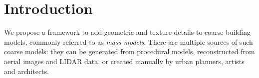 \section{Introduction}



We propose a framework to add geometric and texture details to coarse building models, commonly referred to as  {\em mass models}. There are multiple sources of such coarse models: they can be generated from procedural models, reconstructed from aerial images and \mbox{LIDAR} data, or created manually by urban planners, artists and architects. %







